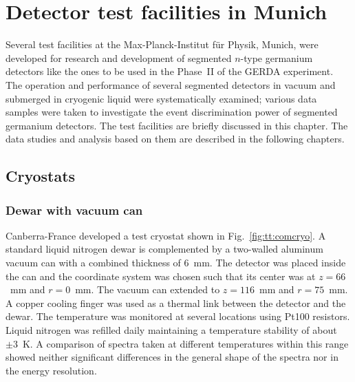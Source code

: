 \chapter{Detector test facilities in Munich}
\label{cha:teststand}
Several test facilities at the Max-Planck-Institut f\"ur Physik, Munich, were developed for research and development of segmented $n$-type germanium detectors like the ones to be used in the Phase~II of the GERDA experiment. The operation and performance of several segmented detectors in vacuum and submerged in cryogenic liquid were systematically examined; various data samples were taken to investigate the event discrimination power of segmented germanium detectors. The test facilities are briefly discussed in this chapter. The data studies and analysis based on them are described in the following chapters.

\section{Cryostats}
\label{sec:tt:cryo}

\subsection{Dewar with vacuum can}
\label{sec:tt:comc}
Canberra-France developed a test cryostat shown in Fig.~\ref{fig:tt:comcryo}. A standard liquid nitrogen dewar is complemented by a two-walled aluminum vacuum can with a combined thickness of 6~mm. The detector was placed inside the can and the coordinate system was chosen such that its center was at $z=66$~mm and $r=0$~mm. The vacuum can extended to $z=116$~mm and $r=75$~mm. A copper cooling finger was used as a thermal link between the detector and the dewar. The temperature was monitored at several locations using Pt100 resistors. Liquid nitrogen was refilled daily maintaining a temperature stability of about $\pm3$~K. A comparison of spectra taken at different temperatures within this range showed neither significant differences in the general shape of the spectra nor in the energy resolution.

